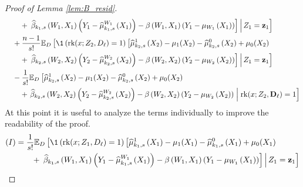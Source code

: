 \begin{proof}[Proof of Lemma \ref{lem:B_resid}]
\begin{equation}
\begin{aligned}
            & \quad \quad + \left. \left. 
            \hat{\beta}_{k_1,s}\left(W_{1}, X_{1}\right)\left(Y_{1} - \hat{\mu}^{W_{1}}_{k_1,s}\left(X_{1}\right)\right)
            - \beta\left(W_{1}, X_{1}\right)\left(Y_{1} - \mu_{W_{1}}\left(X_{1}\right)\right)\right]
            \, \middle| \, Z_1 = \mathbf{z}_1\right] \\
            & \quad + \frac{n-1}{s!} \E_{D}\left[\1\left(\rk(x; Z_{2}, D_{\ell}) = 1\right)
            \left[\hat{\mu}_{k_2,s}^{1}\left(X_{2}\right) - \mu_{1}(X_{2})
            - \hat{\mu}_{k_2,s}^{0}\left(X_{2}\right) + \mu_{0}(X_{2}) \right. \right.\\
            & \quad \quad + \left. \left. 
            \hat{\beta}_{k_2,s}\left(W_{2}, X_{2}\right)\left(Y_{2} - \hat{\mu}^{W_{2}}_{k_2,s}\left(X_{2}\right)\right)
            - \beta\left(W_{2}, X_{2}\right)\left(Y_{2} - \mu_{W_{2}}\left(X_{2}\right)\right)\right]
            \, \middle| \, Z_1 = \mathbf{z}_1\right] \\
            & \quad - \frac{1}{s!} 
            \E_{D}\left[\hat{\mu}_{k_2,s}^{1}\left(X_{2}\right) - \mu_{1}(X_{2})
            - \hat{\mu}_{k_2,s}^{0}\left(X_{2}\right) + \mu_{0}(X_{2}) \right. \\
            & \quad \quad + \left. 
            \hat{\beta}_{k_2,s}\left(W_{2}, X_{2}\right)\left(Y_{2} - \hat{\mu}^{W_{2}}_{k_2,s}\left(X_{2}\right)\right)
            - \beta\left(W_{2}, X_{2}\right)\left(Y_{2} - \mu_{W_{2}}\left(X_{2}\right)\right)\; \middle| \; \operatorname{rk}(x; Z_2, \mathbf{D}_{\ell}) = 1\right]
        \end{aligned}
    \end{equation}
    At this point it is useful to analyze the terms individually to improve the readability of the proof.
    \begin{equation}
        \begin{aligned}
            (I) & = \frac{1}{s!}\E_{D}\left[\1\left(\rk(x; Z_{1}, D_{\ell}) = 1\right)   
            \left[\hat{\mu}_{k_1,s}^{1}\left(X_{1}\right) - \mu_{1}(X_{1})
            - \hat{\mu}_{k_1,s}^{0}\left(X_{1}\right) + \mu_{0}(X_{1}) \right. \right.\\
            & \quad \quad + \left. \left. 
            \hat{\beta}_{k_1,s}\left(W_{1}, X_{1}\right)\left(Y_{1} - \hat{\mu}^{W_{1}}_{k_1,s}\left(X_{1}\right)\right)
            - \beta\left(W_{1}, X_{1}\right)\left(Y_{1} - \mu_{W_{1}}\left(X_{1}\right)\right)\right]
            \, \middle| \, Z_1 = \mathbf{z}_1\right] \\

\end{aligned}
\end{equation}
\end{proof}
